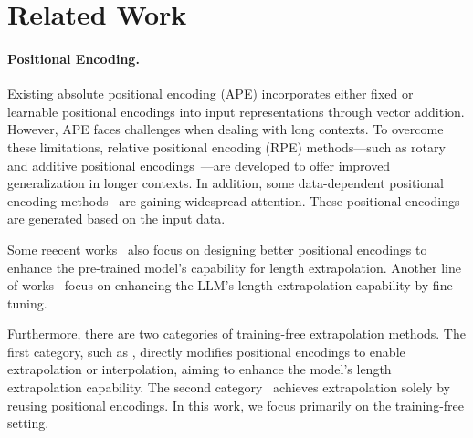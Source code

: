 \section{Related Work}
\label{Related Work}
\paragraph{Positional Encoding.}


Existing absolute positional encoding (APE) \citep{vaswani2017attention, devlin2018bert} incorporates either fixed or learnable positional encodings into input representations through vector addition. However, APE faces challenges when dealing with long contexts. To overcome these limitations, relative positional encoding (RPE) methods—such as rotary and additive positional encodings~\citep{rerope2023, su2024roformer, press2021train}—are developed to offer improved generalization in longer contexts. In addition, some data-dependent positional encoding methods~\citep{golovneva2024contextual, zheng2024dape} are gaining widespread attention. These positional encodings are generated based on the input data. 




Some reecent works~\citep{alibi, chi2022kerple, li2023functional} also focus on designing better positional encodings to enhance the pre-trained model's capability for length extrapolation. Another line of works~\citep{peng2023yarn,NTKByParts2023,chen2023clex} focus on enhancing the LLM's length extrapolation capability by fine-tuning. 

Furthermore, there are two categories of training-free extrapolation methods. The first category, such as \citet{fixedNTK,chen2023extending,dynamicNTK,chen2024hope}, directly modifies positional encodings to enable extrapolation or interpolation, aiming to enhance the model's length extrapolation capability. The second category~\citep{an2024training, xiao2024infllm, ratner2022parallel, zhu2024accelerating} achieves extrapolation solely by reusing positional encodings. In this work, we focus primarily on the training-free setting.

\vspace{-4mm}

